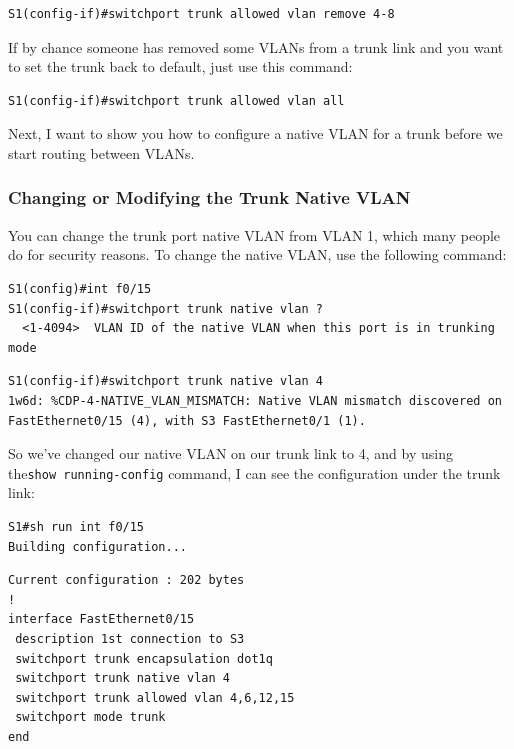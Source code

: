 \documentclass[b5paper,11pt]{memoir}
\begin{document}
\begin{verbatim}
S1(config-if)#switchport trunk allowed vlan remove 4-8
\end{verbatim}

If by chance someone has removed some VLANs from a trunk link and you
want to set the trunk back to default, just use this command:

\begin{verbatim}
S1(config-if)#switchport trunk allowed vlan all
\end{verbatim}

Next, I want to show you how to configure a native VLAN for a trunk
before we start routing between VLANs.

\subsubsection[Changing or Modifying the Trunk Native
VLAN]{\texorpdfstring{\protect\hypertarget{c11.xhtmlux5cux23c11-sec-13}{}{}Changing
or Modifying the Trunk Native
VLAN}{Changing or Modifying the Trunk Native VLAN}}

You can change the trunk port native VLAN from VLAN 1, which many people
do for security reasons. To change the native VLAN, use the following
command:

\begin{verbatim}
S1(config)#int f0/15
S1(config-if)#switchport trunk native vlan ?
  <1-4094>  VLAN ID of the native VLAN when this port is in trunking mode
\end{verbatim}

\begin{verbatim}
S1(config-if)#switchport trunk native vlan 4
1w6d: %CDP-4-NATIVE_VLAN_MISMATCH: Native VLAN mismatch discovered on FastEthernet0/15 (4), with S3 FastEthernet0/1 (1).
\end{verbatim}

So we've changed our native VLAN on our trunk link to 4, and by using
the\texttt{show\ running-config} command, I can see the configuration
under the trunk link:

\begin{verbatim}
S1#sh run int f0/15
Building configuration...
\end{verbatim}

\begin{verbatim}
Current configuration : 202 bytes
!
interface FastEthernet0/15
 description 1st connection to S3
 switchport trunk encapsulation dot1q
 switchport trunk native vlan 4
 switchport trunk allowed vlan 4,6,12,15
 switchport mode trunk
end
\end{verbatim}
\end{document}
